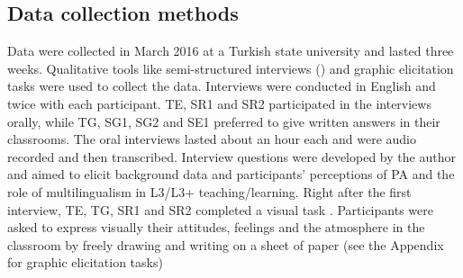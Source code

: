 \documentclass[output=paper]{../langscibook}
\begin{document}
\begin{table}
\end{table}



\subsection{Data collection methods}



Data were collected in March 2016 at a Turkish state university and lasted three weeks. Qualitative tools like semi-structured interviews (\citealt{FraenkleWallen2009}) and graphic elicitation tasks \citep{Bagnoli2009} were used to collect the data. Interviews were conducted in English and twice with each participant. TE, SR1 and SR2 participated in the interviews orally, while TG, SG1, SG2 and SE1 preferred to give written answers in their classrooms. The oral interviews lasted about an hour each and were audio recorded and then transcribed. Interview questions were developed by the author and aimed to elicit background data and participants’ perceptions of PA and the role of multilingualism in L3/L3+ teaching/learning.  Right after the first interview, TE, TG, SR1 and SR2 completed a visual task \citep{Bagnoli2009}. Participants were asked to express visually their attitudes, feelings and the atmosphere in the classroom by freely drawing and writing on a sheet of paper (see the Appendix for graphic elicitation tasks)
\end{document}
